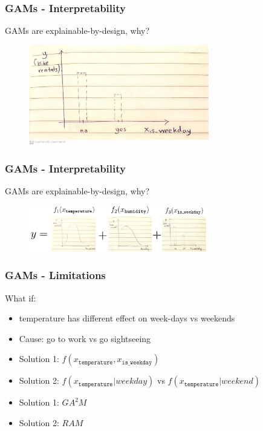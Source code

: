 \documentclass{beamer}
\begin{document}
\begin{frame}
  \frametitle{GAMs - Interpretability}

  GAMs are explainable-by-design, why?

  \noindent\makebox[\linewidth]{\rule{\paperwidth}{0.4pt}}

  \begin{figure}[ht]
    \centering
    \includegraphics[width=0.7\textwidth]{./figures/gam_is_weekday.jpg}
  \end{figure}

\end{frame}

\begin{frame}
  \frametitle{GAMs - Interpretability}

  GAMs are explainable-by-design, why?

  \noindent\makebox[\linewidth]{\rule{\paperwidth}{0.4pt}}

  \begin{figure}[ht]
    \centering
    \includegraphics[width=0.7\textwidth]{./figures/additive_model.png}
  \end{figure}

\end{frame}


\begin{frame}
  \frametitle{GAMs - Limitations}

  What if:
  \begin{itemize}
  \item<1-> temperature has different effect on week-days vs weekends
  \item<2-> Cause: go to work vs go sightseeing
  \item<3-> Solution 1: \(f(x_{\mathtt{temperature}}, x_{\mathtt{is\_weekday}})\)
  \item<4-> Solution 2: \(f(x_{\mathtt{temperature}} | weekday )\) vs \(f(x_{\mathtt{temperature}} | weekend )\)
  \end{itemize}

  \noindent\makebox[\linewidth]{\rule{\paperwidth}{0.4pt}}
  \begin{itemize}
  \item<5-> Solution 1: \(GA^2M\)
  \item<6-> Solution 2: \(RAM\)
  \end{itemize}

\end{frame}
\end{document}
